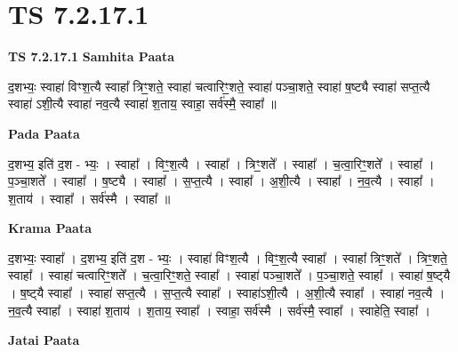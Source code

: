 \documentclass[17pt]{extarticle}
\begin{document}
\section{ TS 7.2.17.1 }

\textbf{TS 7.2.17.1 } \newline
\textbf{Samhita Paata} \newline

द॒शभ्यः॒ स्वाहा॑ विꣳश॒त्यै स्वाहा᳚ त्रिꣳ॒॒शते॒ स्वाहा॑ चत्वारिꣳ॒॒शते॒ स्वाहा॑ पञ्चा॒शते॒ स्वाहा॑ ष॒ष्ट्यै स्वाहा॑ सप्त॒त्यै स्वाहा॑ ऽशी॒त्यै स्वाहा॑ नव॒त्यै स्वाहा॑ श॒ताय॒ स्वाहा॒ सर्व॑स्मै॒ स्वाहा᳚ ॥ \newline

\textbf{Pada Paata} \newline

द॒शभ्य॒ इति॑ द॒श - भ्यः॒ । स्वाहा᳚ । विꣳ॒॒श॒त्यै । स्वाहा᳚ । त्रिꣳ॒॒शते᳚ । स्वाहा᳚ । च॒त्वा॒रिꣳ॒॒शते᳚ । स्वाहा᳚ । प॒ञ्चा॒शते᳚ । स्वाहा᳚ । ष॒ष्ट्यै । स्वाहा᳚ । स॒प्त॒त्यै । स्वाहा᳚ । अ॒शी॒त्यै । स्वाहा᳚ । न॒व॒त्यै । स्वाहा᳚ । श॒ताय॑ । स्वाहा᳚ । सर्व॑स्मै । स्वाहा᳚ ॥  \newline


\textbf{Krama Paata} \newline

द॒शभ्यः॒ स्वाहा᳚ । द॒शभ्य॒ इति॑ द॒श - भ्यः॒ । स्वाहा॑ विꣳश॒त्यै । विꣳ॒॒श॒त्यै स्वाहा᳚ । स्वाहा᳚ त्रिꣳ॒॒शते᳚ । त्रिꣳ॒॒शते॒ स्वाहा᳚ । स्वाहा॑ चत्वारिꣳ॒॒शते᳚ । च॒त्वा॒रिꣳ॒॒शते॒ स्वाहा᳚ । स्वाहा॑ पञ्चा॒शते᳚ । प॒ञ्चा॒शते॒ स्वाहा᳚ । स्वाहा॑ ष॒ष्ट्‍यै । ष॒ष्ट्‍यै स्वाहा᳚ । स्वाहा॑ सप्त॒त्यै । स॒प्त॒त्यै स्वाहा᳚ । स्वाहा॑ऽशी॒त्यै । अ॒शी॒त्यै स्वाहा᳚ । स्वाहा॑ नव॒त्यै । न॒व॒त्यै स्वाहा᳚ । स्वाहा॑ श॒ताय॑ । श॒ताय॒ स्वाहा᳚ । स्वाहा॒ सर्व॑स्मै । सर्व॑स्मै॒ स्वाहा᳚ । स्वाहेति॒ स्वाहा᳚ । \newline

\textbf{Jatai Paata} \newline
\end{document}
